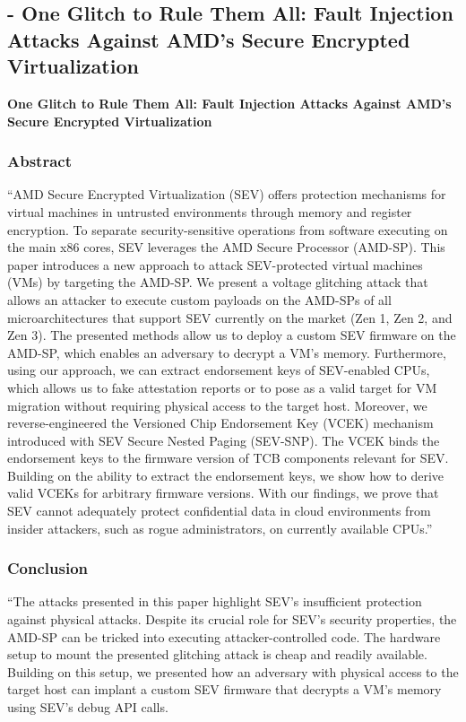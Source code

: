 
\subsection{\cite{buhren_one_2021} - One Glitch to Rule Them All: Fault Injection Attacks Against AMD's Secure Encrypted Virtualization} 

\textbf{One Glitch to Rule Them All: Fault Injection Attacks Against AMD's Secure Encrypted Virtualization }

\subsubsection*{Abstract \cite{buhren_one_2021}}
“AMD Secure Encrypted Virtualization (SEV) offers protection mechanisms for virtual machines in untrusted environments through memory and register encryption. To separate security-sensitive operations from software executing on the main x86 cores, SEV leverages the AMD Secure Processor (AMD-SP). This paper introduces a new approach to attack SEV-protected virtual machines (VMs) by targeting the AMD-SP. We present a voltage glitching attack that allows an attacker to execute custom payloads on the AMD-SPs of all microarchitectures that support SEV currently on the market (Zen 1, Zen 2, and Zen 3). The presented methods allow us to deploy a custom SEV firmware on the AMD-SP, which enables an adversary to decrypt a VM's memory. Furthermore, using our approach, we can extract endorsement keys of SEV-enabled CPUs, which allows us to fake attestation reports or to pose as a valid target for VM migration without requiring physical access to the target host. Moreover, we reverse-engineered the Versioned Chip Endorsement Key (VCEK) mechanism introduced with SEV Secure Nested Paging (SEV-SNP). The VCEK binds the endorsement keys to the firmware version of TCB components relevant for SEV. Building on the ability to extract the endorsement keys, we show how to derive valid VCEKs for arbitrary firmware versions. With our findings, we prove that SEV cannot adequately protect confidential data in cloud environments from insider attackers, such as rogue administrators, on currently available CPUs.”

\subsubsection*{Conclusion  \cite{buhren_one_2021}}
“The attacks presented in this paper highlight SEV’s insufficient protection against physical attacks. Despite its crucial role for SEV’s security properties, the AMD-SP can be tricked into executing attacker-controlled code. The hardware setup to mount the presented glitching attack is cheap and readily available. Building on this setup, we presented how an adversary with physical access to the target host can implant a custom SEV firmware that decrypts a VM’s memory using SEV’s debug API calls.

